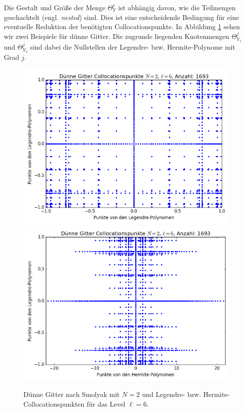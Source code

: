 Die Gestalt und Größe der Menge $\Theta_Y^\ell$ ist abhängig davon, wie die Teilmengen geschachtelt (engl. \emph{nested}) sind. Dies ist eine entscheidende Bedingung für eine eventuelle Reduktion der benötigten Collocationspunkte. In Abbildung \ref{fig:grids} sehen wir zwei Beispiele für dünne Gitter. Die zugrunde liegenden Knotenmengen $\Theta_{Y_1}^j$ und $\Theta_{Y_2}^j$ sind dabei die Nullstellen der Legendre- bzw. Hermite-Polynome mit Grad $j$.
\begin{figure}[!htb]
  \includegraphics[width=\linewidth]{Figures/sparse_grid_legendre_legendre.png}
\endminipage
{}
  \includegraphics[width=\linewidth]{Figures/sparse_grid_hermite_legendre.png}
\endminipage
\caption{Dünne Gitter nach Smolyak mit $N=2$ und Legendre- bzw. Hermite-Collocationspunkten für das Level $\ell=6$.}
\label{fig:grids}
\end{figure}
